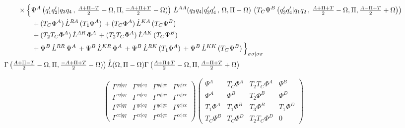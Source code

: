 \documentclass[10pt]{scrartcl}
\newcommand{\q}[6]{
	\ifcase #5
		q_#1 q_#2 
	\or
		q_#1^\prime q_#2^\prime 
	\else
		0
	\fi
	|
	\ifcase #6
		q_#3 q_#4
	\or
		q_#3^\prime q_#4^\prime
	\else
		0
	\fi
	\,,\,
}
\begin{document}
\begin{align}
& \qquad \times
\Big\{
\Psi^A \left(
\q123410 \tfrac{A+\Pi-T}{2} - \Omega, \Pi, \tfrac{-A+\Pi+T}{2} - \Omega)
\right) \, 
\dot{L}^{AA} (\q343401 \Omega, \Pi-\Omega) \, 
\left(T_C \Psi^B \left(
\q341210 \tfrac{A+\Pi+T}{2} - \Omega, \Pi, \tfrac{A-\Pi+T}{2} + \Omega
\right)\right) \,
\nonumber \\
& \qquad \qquad +
(T_C \Phi^A) \, 
\dot{L}^{RA} \, 
(T_1 \Phi^A) \,
+
(T_C \Phi^A) \, 
\dot{L}^{KA} \, 
(T_C \Psi^B) \,
\nonumber \\
& \qquad \qquad +
(T_2 T_C \Phi^A) \, 
\dot{L}^{AR} \, 
\Phi^A \,
+
(T_2 T_C \Phi^A) \, 
\dot{L}^{AK} \, 
(T_C \Psi^B) \,
\nonumber \\
& \qquad \qquad +
\Psi^B \, 
\dot{L}^{RR} \, 
\Psi^A \,
+
\Psi^B \, 
\dot{L}^{KR} \, 
\Phi^A \,
+
\Psi^B \, 
\dot{L}^{RK} \, 
(T_1 \Phi^A) \,
+
\Psi^B \, 
\dot{L}^{KK} \, 
(T_C \Psi^B) \,
\Big\}_{\sigma \sigma | \sigma \sigma}
\nonumber \\
&\Gamma \left(
\tfrac{A+\Pi-T}{2} - \Omega, \Pi, \tfrac{-A+\Pi+T}{2} - \Omega)
\right)
\dot{\tilde{L}} (\Omega, \Pi - \Omega)
\Gamma \left(
\tfrac{A+\Pi+T}{2} - \Omega, \Pi, \tfrac{A-\Pi+T}{2} + \Omega
\right)
\end{align}



\begin{align}
\left( 
\begin{matrix}
\Gamma^{qq|qq} & \Gamma^{qq|cq} & \Gamma^{qq|qc} & \Gamma^{qq|cc} \\
\Gamma^{cq|qq} & \Gamma^{cq|cq} & \Gamma^{cq|qc} & \Gamma^{cq|cc} \\
\Gamma^{qc|qq} & \Gamma^{qc|cq} & \Gamma^{qc|qc} & \Gamma^{qc|cc} \\
\Gamma^{cc|qq} & \Gamma^{cc|cq} & \Gamma^{cc|qc} & \Gamma^{cc|cc} 
\end{matrix}
\right)
\left( 
\begin{matrix}
\Psi^A & T_C \Phi^A & T_2 T_C \Phi^A & \Psi^B \\
\Phi^A & \Phi^B & T_2 \Phi^B & \Phi^D \\
T_1 \Phi^A & T_1 \Phi^B & T_3 \Phi^B & T_1 \Phi^D \\
T_C \Psi^B & T_C \Phi^D & T_2 T_C \Phi^D & 0
\end{matrix}
\right)
\end{align}
\end{document}
